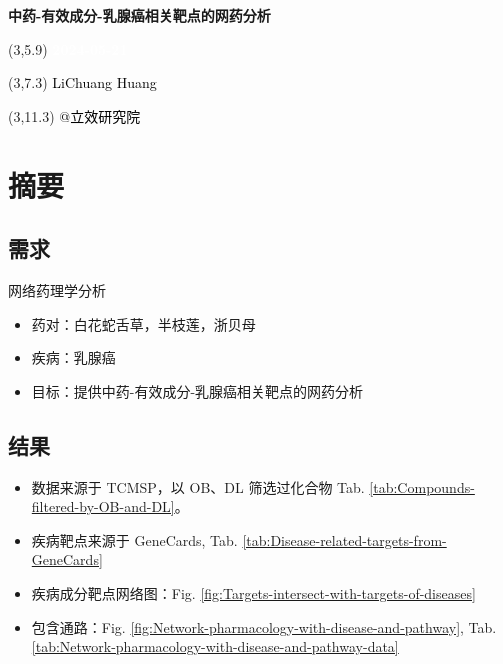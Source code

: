 \documentclass[
]{article}
\author{}
\date{\vspace{-2.5em}}
\providecommand{\tightlist}{%
  \setlength{\itemsep}{0pt}\setlength{\parskip}{0pt}}
\begin{document}
\begin{titlepage} 
\begin{center} \textbf{\Huge
中药-有效成分-乳腺癌相关靶点的网药分析}
\vspace{4em} \begin{textblock}{10}(3,5.9) \huge
\textbf{\textcolor{white}{2024-05-21}}
\end{textblock} \begin{textblock}{10}(3,7.3)
\Large \textcolor{black}{LiChuang Huang}
\end{textblock} \begin{textblock}{10}(3,11.3)
\Large \textcolor{black}{@立效研究院}
\end{textblock} \end{center} \end{titlepage}
\restoregeometry


\tableofcontents

\listoffigures

\listoftables

\newpage


\hypertarget{abstract}{%
\section{摘要}\label{abstract}}

\hypertarget{ux9700ux6c42}{%
\subsection{需求}\label{ux9700ux6c42}}

网络药理学分析

\begin{itemize}
\tightlist
\item
  药对：白花蛇舌草，半枝莲，浙贝母
\item
  疾病：乳腺癌
\item
  目标：提供中药-有效成分-乳腺癌相关靶点的网药分析
\end{itemize}

\hypertarget{ux7ed3ux679c}{%
\subsection{结果}\label{ux7ed3ux679c}}

\begin{itemize}
\tightlist
\item
  数据来源于 TCMSP，以 OB、DL 筛选过化合物 Tab. \ref{tab:Compounds-filtered-by-OB-and-DL}。
\item
  疾病靶点来源于 GeneCards, Tab. \ref{tab:Disease-related-targets-from-GeneCards}
\item
  疾病成分靶点网络图：Fig. \ref{fig:Targets-intersect-with-targets-of-diseases}
\item
  包含通路：Fig. \ref{fig:Network-pharmacology-with-disease-and-pathway},
  Tab. \ref{tab:Network-pharmacology-with-disease-and-pathway-data}
\end{itemize}
\end{document}
